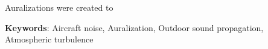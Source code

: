 %
%
%
%
%
%

%




Auralizations were created to


\textbf{Keywords}: Aircraft noise, Auralization, Outdoor sound propagation, Atmospheric turbulence

